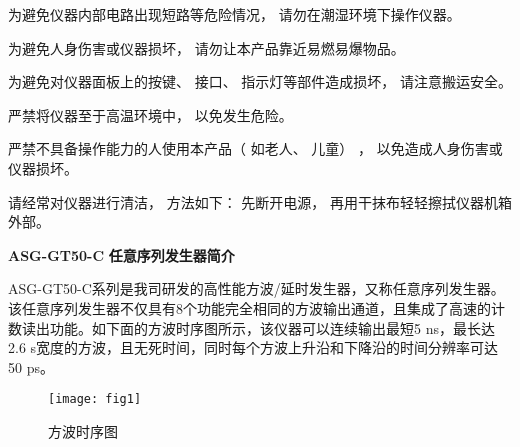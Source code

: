 \vspace{0.6cm}

为避免仪器内部电路出现短路等危险情况， 请勿在潮湿环境下操作仪器。


\vspace{0.6cm}

为避免人身伤害或仪器损坏， 请勿让本产品靠近易燃易爆物品。

\vspace{0.6cm}

为避免对仪器面板上的按键、 接口、 指示灯等部件造成损坏， 请注意搬运安全。

\newpage

严禁将仪器至于高温环境中， 以免发生危险。

\vspace{0.5cm}

严禁不具备操作能力的人使用本产品（ 如老人、 儿童） ， 以免造成人身伤害或仪器损坏。

\vspace{0.5cm}

请经常对仪器进行清洁， 方法如下： 先断开电源， 再用干抹布轻轻擦拭仪器机箱外部。

\newpage
\noindent\huge \textbf{ASG-GT50-C} \xiaoer\textbf{任意序列发生器简介}
\vspace{0.6cm}

\normalsize ASG-GT50-C\song 系列是我司研发的高性能方波/延时发生器，又称任意序列发生器。该任意序列发生器不仅具有8个功能完全相同的方波输出通道，且集成了高速的计数读出功能。如下面的方波时序图所示，该仪器可以连续输出最短5 ns，最长达2.6 s宽度的方波，且无死时间，同时每个方波上升沿和下降沿的时间分辨率可达50 ps。
\begin{figure}[ht]
\centering
\texttt{[image: fig1]}
\caption{方波时序图}\label{fig:fig1}
\end{figure}
\vspace{0.7cm}

